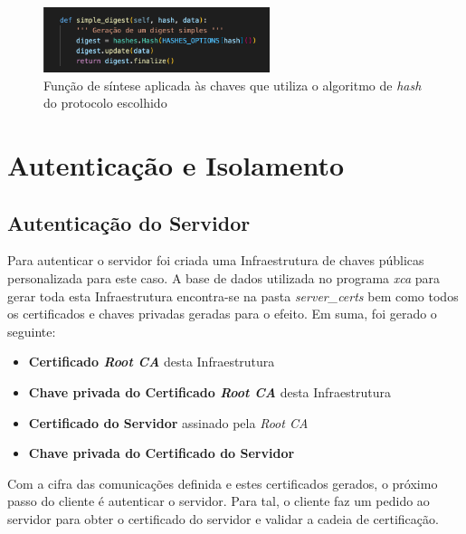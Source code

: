 \documentclass[10pt,english]{article}
\begin{document}
\begin{itemize}
\begin{figure}[!h]
        \centering
        \includegraphics[width=250]{images/simple_digest.png}
        \caption{Função de síntese aplicada às chaves que utiliza o algoritmo de \textit{hash} do protocolo escolhido}
\end{figure}

\end{itemize}

\clearpage

\section{Autenticação e Isolamento}

\subsection{Autenticação do Servidor}

\par Para autenticar o servidor foi criada uma Infraestrutura de chaves públicas personalizada para este caso. A base de dados utilizada no programa \textit{xca} para gerar toda esta Infraestrutura encontra-se na pasta \textit{server\_certs} bem como todos os certificados e chaves privadas geradas para o efeito. Em suma, foi gerado o seguinte:

\begin{itemize}
    \item \textbf{Certificado \textit{Root CA}} desta Infraestrutura
    \item \textbf {Chave privada do Certificado \textit{Root CA}} desta Infraestrutura
     \item \textbf{Certificado do Servidor} assinado pela \textit{Root CA}
     \item \textbf{Chave privada do Certificado do Servidor}
\end{itemize}

\par Com a cifra das comunicações definida e estes certificados gerados, o próximo passo do cliente é autenticar o servidor. Para tal, o cliente faz um pedido ao servidor para obter o certificado do servidor e validar a cadeia de certificação.
\end{document}
